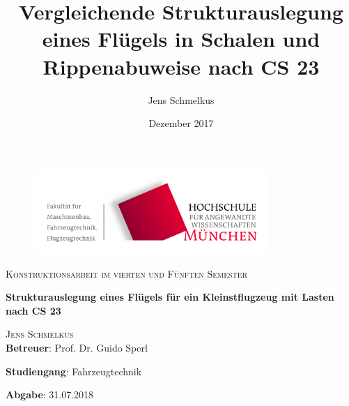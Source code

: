 \begin{titlepage}
\setcounter{page}{1}
\begin{center}
\begin{figure}[h!]
\vspace{0cm}
\centering
\includegraphics[width=0.8\textwidth]{bilder/Logos/FK03_CMYK_Block.png}
\\[0.8cm]
\end{figure}
\vspace{1.5cm}

{\fontsize{20}{60}\scshape Konstruktionsarbeit im vierten und Fünften Semester} 
\\[1.1cm]

\begin{doublespace}
{\fontsize{30}{22}\selectfont \textbf{Strukturauslegung eines Flügels für ein Kleinstflugzeug mit Lasten nach CS 23}\par} 
\vspace{1.4cm}
\end{doublespace}

\title{Vergleichende Strukturauslegung eines Flügels in Schalen und Rippenabuweise nach CS 23}
\author{Jens Schmelkus}
\date{Dezember 2017}

{\fontsize{23}{60}\scshape Jens Schmelkus} 
\\[2.0cm]


\textbf{Betreuer}: Prof. Dr. Guido Sperl




\textbf{Studiengang}: Fahrzeugtechnik 

\textbf{Abgabe}: 31.07.2018

\vfill


\end{center}
\end{titlepage}
